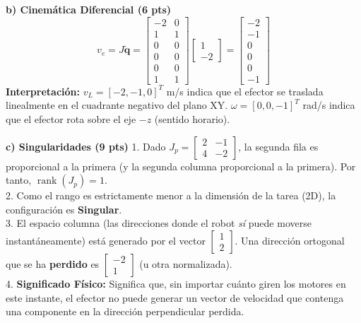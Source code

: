 \documentclass[11pt, a4paper]{article}
\begin{document}
\textbf{b) Cinemática Diferencial (6 pts)}
\begin{equation*}
    v_e = J\dot{\mathbf{q}} = \begin{bmatrix} -2 & 0 \\ 1 & 1 \\ 0 & 0 \\ 0 & 0 \\ 0 & 0 \\ 1 & 1 \end{bmatrix} \begin{bmatrix} 1 \\ -2 \end{bmatrix} = \boxed{ \begin{bmatrix} -2 \\ -1 \\ 0 \\ 0 \\ 0 \\ -1 \end{bmatrix} } \text{}
\end{equation*}
\textbf{Interpretación:} $v_L = [-2, -1, 0]^T$ m/s indica que el efector se traslada linealmente en el cuadrante negativo del plano XY. $\omega = [0, 0, -1]^T$ rad/s indica que el efector rota sobre el eje $-z$ (sentido horario).

\textbf{c) Singularidades (9 pts)}
1. Dado $J_p = \begin{bmatrix} 2 & -1 \\ 4 & -2 \end{bmatrix}$, la segunda fila es proporcional a la primera (y la segunda columna proporcional a la primera). Por tanto, $\operatorname{rank}(J_p) = 1$. \\
2. Como el rango es estrictamente menor a la dimensión de la tarea (2D), la configuración es \textbf{Singular}. \\
3. El espacio columna (las direcciones donde el robot \textit{sí} puede moverse instantáneamente) está generado por el vector $\begin{bmatrix} 1 \\ 2 \end{bmatrix}$. Una dirección ortogonal que se ha \textbf{perdido} es $\boxed{ \begin{bmatrix} -2 \\ 1 \end{bmatrix} }$ (u otra normalizada). \\
4. \textbf{Significado Físico:} Significa que, sin importar cuánto giren los motores en este instante, el efector no puede generar un vector de velocidad que contenga una componente en la dirección perpendicular perdida.
\end{document}
